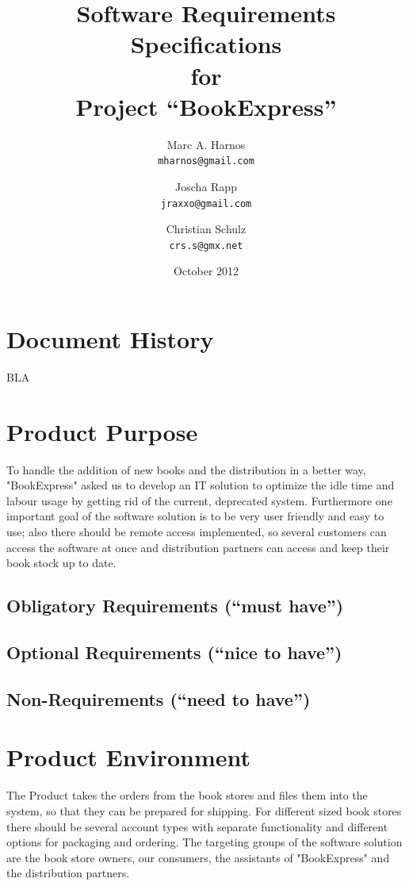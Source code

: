 \documentclass[11pt,a4paper,oneside,svgnames,draft]{report}
\begin{document}
\title{Software Requirements Specifications\\ for\\ Project ``BookExpress''}
\author{Marc A. Harnos\\ \texttt{mharnos@gmail.com} \and Joscha Rapp\\ \texttt{jraxxo@gmail.com} \and Christian Schulz\\ \texttt{crs.s@gmx.net}}
\date{October 2012}
\maketitle
\tableofcontents

\chapter*{Document History}
BLA

\chapter{Product Purpose}
To handle the addition of new books and the distribution in a better way, "BookExpress" asked us to develop an IT solution to optimize the idle time and labour usage by getting rid of the current, deprecated system. Furthermore one important goal of the software solution is to be very user friendly and easy to use; also there should be remote access implemented, so several customers can access the software at once and distribution partners can access and keep their book stock up to date.
\section{Obligatory Requirements (``must have'')}
\section{Optional Requirements (``nice to have'')}
\section{Non-Requirements (``need to have'')}

\chapter{Product Environment}
The Product takes the orders from the book stores and files them into the system, so that they can be prepared for shipping. For different sized book stores there should be several account types with separate functionality and different options for packaging and ordering. The targeting groups of the software solution are the book store owners, our consumers, the assistants of "BookExpress" and the distribution partners.
\end{document}
